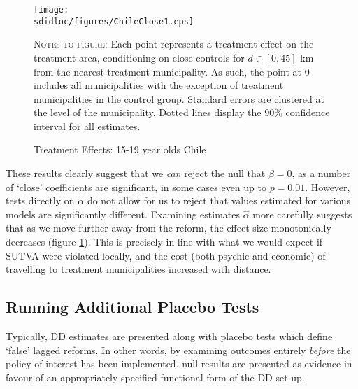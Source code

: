 \begin{figure}[h!]
\texttt{[image: \\sdidloc/figures/ChileClose1.eps]}
\caption{Treatment Effects: 15-19 year olds Chile}
\label{Sfig:ChileAlpha}
\vspace{2mm}
\begin{footnotesize}
\textsc{Notes to figure}: Each point represents a treatment effect on the treatment
area, conditioning on close controls for $d\in [0,45]$ km from the nearest treatment 
municipality.  As such, the point at 0 includes all municipalities with the exception
of treatment municipalities in the control group.  Standard errors are clustered at 
the level of the municipality.  Dotted lines display the 90\% confidence interval for 
all estimates.
\end{footnotesize}
\end{figure}

These results clearly suggest that we \emph{can} reject the null that $\beta=0$, as
a number of `close' coefficients are significant, in some cases even up to $p=0.01$.
However, tests directly on $\alpha$ do not allow for us to reject that values 
estimated for various models are significantly different.  Examining estimates 
$\hat\alpha$ more carefully suggests that as we move further away from the reform,
the effect size monotonically decreases (figure \ref{Sfig:ChileAlpha}).  This is
precisely in-line with what we would expect if SUTVA were violated locally, and
the cost (both psychic and economic) of travelling to treatment municipalities
increased with distance.

\subsection{Running Additional Placebo Tests}
Typically, DD estimates are presented along with placebo tests which define `false'
lagged reforms.  In other words, by examining outcomes entirely \emph{before} the
policy of interest has been implemented, null results are presented as evidence
in favour of an appropriately specified functional form of the DD set-up.

